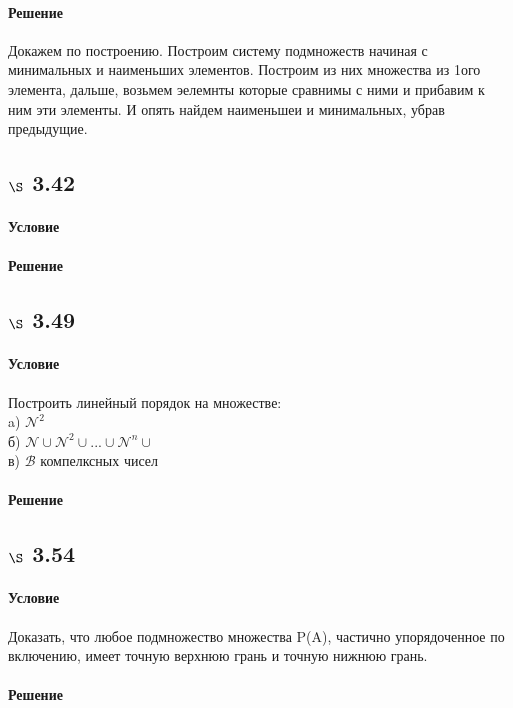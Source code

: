 \documentclass[a4paper,12pt]{article}
\begin{document}
\paragraph*{Решение}
Докажем по построению. Построим систему подмножеств начиная с минимальных и наименьших элементов. Построим из них множества из 1ого элемента, дальше, возьмем эелемнты которые сравнимы с ними и прибавим к ним эти элементы. И опять найдем наименьшеи и минимальных, убрав предыдущие.

\subsection*{$\S$ 3.42}
\paragraph*{Условие}
\paragraph*{Решение}

\subsection*{$\S$ 3.49}
\paragraph*{Условие}
Построить линейный порядок на множестве:\\
a) $ \mathscr{N}^2 $\\
б) $ \mathscr{N} \cup \mathscr{N}^2 \cup ... \cup \mathscr{N}^n \cup $\\
в) $ \mathscr{B}$ компелксных чисел
\paragraph*{Решение}

\subsection*{$\S$ 3.54}
\paragraph*{Условие} Доказать, что любое подмножество множества P(A), частично упорядоченное по включению, имеет точную верхнюю грань и точную нижнюю грань.
\paragraph*{Решение}
\end{document}
